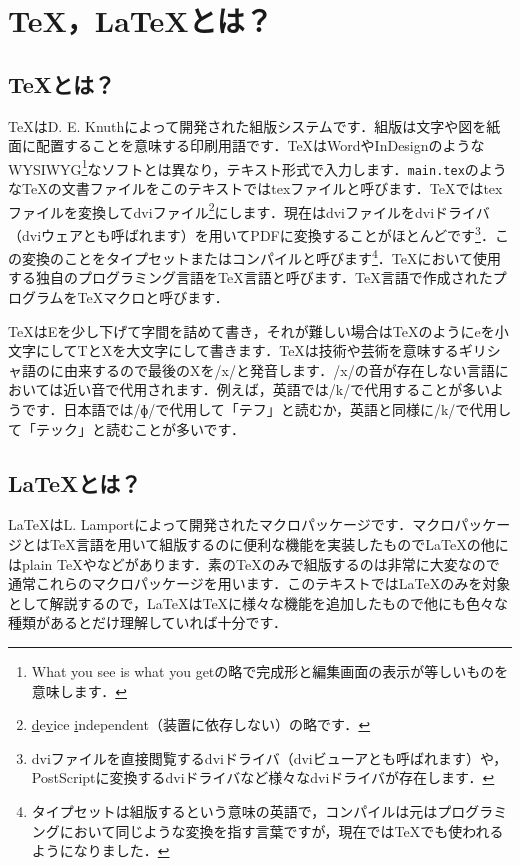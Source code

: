 \section{\TeX，\LaTeX とは？}
\subsection{\TeX とは？}
\TeX はD. E. Knuthによって開発された組版システムです．組版は文字や図を紙面に配置することを意味する印刷用語です．\TeX はWordやInDesignのようなWYSIWYG\footnote{What you see is what you getの略で完成形と編集画面の表示が等しいものを意味します．}なソフトとは異なり，テキスト形式で入力します．\texttt{main.tex}のような\TeX の文書ファイルをこのテキストではtexファイルと呼びます．\TeX ではtexファイルを変換してdviファイル\footnote{\underline{d}e\underline{v}ice \underline{i}ndependent（装置に依存しない）の略です．}にします．現在はdviファイルをdviドライバ（dviウェアとも呼ばれます）を用いてPDFに変換することがほとんどです\footnote{dviファイルを直接閲覧するdviドライバ（dviビューアとも呼ばれます）や，PostScriptに変換するdviドライバなど様々なdviドライバが存在します．}．この変換のことをタイプセットまたはコンパイルと呼びます\footnote{タイプセットは組版するという意味の英語で，コンパイルは元はプログラミングにおいて同じような変換を指す言葉ですが，現在では\TeX でも使われるようになりました．}．\TeX において使用する独自のプログラミング言語を\TeX 言語と呼びます．\TeX 言語で作成されたプログラムを\TeX マクロと呼びます．

\TeX はEを少し下げて字間を詰めて書き，それが難しい場合はTeXのようにeを小文字にしてTとXを大文字にして書きます．\TeX は技術や芸術を意味するギリシャ語のに由来するので最後のXを/x/と発音します．/x/の音が存在しない言語においては近い音で代用されます．例えば，英語では/k/で代用することが多いようです．日本語では/ɸ/で代用して「テフ」と読むか，英語と同様に/k/で代用して「テック」と読むことが多いです．

\subsection{\LaTeX とは？}
\LaTeX はL. Lamportによって開発されたマクロパッケージです．マクロパッケージとは\TeX 言語を用いて組版するのに便利な機能を実装したもので\LaTeX の他にはplain \TeX や\ConTeXt などがあります．素の\TeX のみで組版するのは非常に大変なので通常これらのマクロパッケージを用います．このテキストでは\LaTeX のみを対象として解説するので，\LaTeX は\TeX に様々な機能を追加したもので他にも色々な種類があるとだけ理解していれば十分です．

